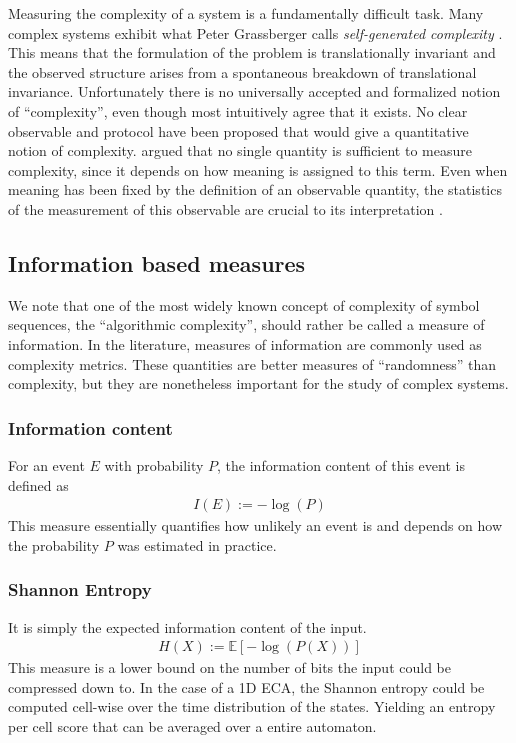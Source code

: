 Measuring the complexity of a system is a fundamentally difficult task. Many
complex systems exhibit what Peter Grassberger calls \emph{self-generated
  complexity} \parencite{grassbergerQuantitativeTheorySelfgenerated1986}. This
means that the formulation of the problem is translationally invariant and the
observed structure arises from a spontaneous breakdown of translational
invariance. Unfortunately there is no universally accepted and formalized notion
of ``complexity'', even though most intuitively agree that it exists. No clear
observable and protocol have been proposed that would give a quantitative notion
of complexity. \textcite{grassbergerProblemsQuantifyingSelfgenerated1989} argued
that no single quantity is sufficient to measure complexity, since it depends on
how meaning is assigned to this term. Even when meaning has been fixed by the
definition of an observable quantity, the statistics of the measurement of this
observable are crucial to its interpretation
\parencite{gutowitzCellularAutomataSciences1995}.


\subsection{Information based measures}

We note that one of the most widely known concept of complexity of symbol
sequences, the ``algorithmic complexity'', should rather be called a measure of
information. In the literature, measures of information are commonly used as
complexity metrics. These quantities are better measures of ``randomness'' than
complexity, but they are nonetheless important for the study of complex systems.

\subsubsection{Information content}
For an event $E$ with probability $P$, the information content of this event is
defined as
\begin{align*}
  I(E) := -\log(P)
\end{align*}
This measure essentially quantifies how unlikely an event is and depends on how
the probability $P$ was estimated in practice.

\subsubsection{Shannon Entropy}
It is simply the expected information content of the input.
\begin{align*}
  H(X) := \mathbb{E}[-\log(P(X))]
\end{align*}
This measure is a lower bound on the number of bits the input could be
compressed down to. In the case of a 1D ECA, the Shannon entropy could be
computed cell-wise over the time distribution of the states. Yielding an entropy
per cell score that can be averaged over a entire automaton.

